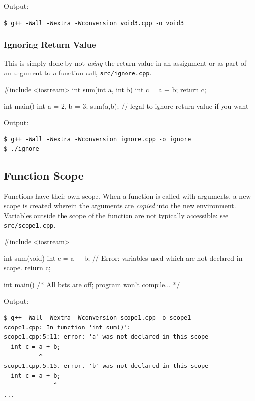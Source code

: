 \documentclass[12pt,letterpaper,twoside]{article}
\begin{document}
Output:

\begin{verbatim}
$ g++ -Wall -Wextra -Wconversion void3.cpp -o void3
\end{verbatim}

\subsubsection{Ignoring Return Value} This is simply done by not \emph{using} the return
value in an assignment or as part of an argument to a function call;
\texttt{src/ignore.cpp}:

\begin{cpp}
#include <iostream>
int sum(int a, int b) {
  int c = a + b;
  return c;
}

int main() {
  int a = 2, b = 3;
  sum(a,b); // legal to ignore return value if you want
}
\end{cpp}

Output:

\begin{verbatim}
$ g++ -Wall -Wextra -Wconversion ignore.cpp -o ignore
$ ./ignore
\end{verbatim}

\subsection{Function Scope} Functions have their own scope. When a function is called with
arguments, a new scope is created wherein the arguments are \emph{copied} into the new 
environment. Variables outside the scope of the function are not typically accessible; see
\texttt{src/scope1.cpp}.

\begin{cpp}
#include <iostream>

int sum(void) {
  int c = a + b;  // Error: variables used which are not declared in scope.
  return c;
}

int main() {  /* All bets are off; program won't compile... */ }
\end{cpp}

Output:

\begin{verbatim}
$ g++ -Wall -Wextra -Wconversion scope1.cpp -o scope1
scope1.cpp: In function 'int sum()':
scope1.cpp:5:11: error: 'a' was not declared in this scope
  int c = a + b;
          ^
scope1.cpp:5:15: error: 'b' was not declared in this scope
  int c = a + b;
              ^
...
\end{verbatim}
\end{document}
